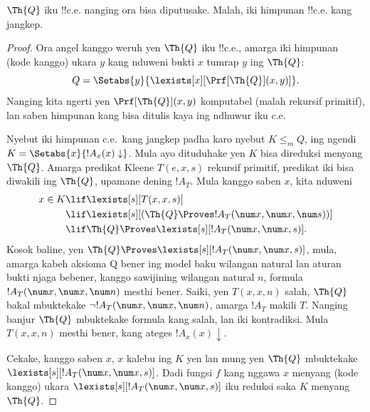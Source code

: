 \documentclass[../../../include/open-logic-section]{subfiles}
\begin{document}



\begin{thm}
$\Th{Q}$ iku !!{c.e.} nanging ora bisa diputusake. Malah,
  iki himpunan !!{c.e.} kang jangkep.
\end{thm}

\begin{proof}
Ora angel kanggo weruh yen $\Th{Q}$ iku !!{c.e.}, amarga iki himpunan
(kode kanggo) ukara $y$ kang nduweni bukti $x$ tumrap $y$ ing
$\Th{Q}$:
\[
Q = \Setabs{y}{\lexists[x][\Prf[\Th{Q}](x,y)]}.
\]
Nanging kita ngerti yen $\Prf[\Th{Q}](x,y)$ komputabel (malah rekursif
primitif), lan saben himpunan kang bisa ditulis kaya ing ndhuwur iku c.e.

Nyebut iki himpunan c.e.\ kang jangkep padha karo nyebut $K
\leq_m Q$, ing ngendi $K = \Setabs{x}{!A_x(x) \downarrow}$. Mula ayo
dituduhake yen $K$ bisa direduksi menyang $\Th{Q}$. Amarga predikat
Kleene $T(e,x,s)$ rekursif primitif, predikat iki bisa diwakili
ing $\Th{Q}$, upamane dening $!A_T$. Mula kanggo saben $x$, kita nduweni
\begin{align*}
x \in K & \lif \lexists[s][T(x,x,s)] \\
& \lif \lexists[s][(\Th{Q} \Proves !A_T(\num x,\num x, \num s))]
  \\
& \lif \Th{Q} \Proves \lexists[s][!A_T(\num x, \num x, s)].
\end{align*}
Kosok baline, yen $\Th{Q} \Proves \lexists[s][!A_T(\num x, \num x, s)]$,
mula, amarga kabeh aksioma Q bener ing model baku wilangan natural lan aturan bukti njaga bebener, kanggo sawijining wilangan natural $n$, formula $!A_T(\num x,
\num x, \num n)$ mesthi bener. Saiki, yen $T(x,x,n)$ salah,
$\Th{Q}$ bakal mbuktekake $\lnot !A_T(\num x, \num x, \num n)$, amarga
$!A_T$ makili $T$. Nanging banjur $\Th{Q}$ mbuktekake
formula kang salah, lan iki kontradiksi. Mula $T(x,x,n)$ mesthi bener,
kang ateges $!A_x(x) \downarrow$.

Cekake, kanggo saben $x$, $x$ kalebu ing $K$ yen lan mung yen
$\Th{Q}$ mbuktekake $\lexists[s][!A_T(\num x,\num x,s)]$. Dadi fungsi $f$
kang nggawa $x$ menyang (kode kanggo) ukara $\lexists[s][!A_T(\num x,
  \num x, s)]$ iku reduksi saka $K$ menyang $\Th{Q}$.
\end{proof}
\end{document}
